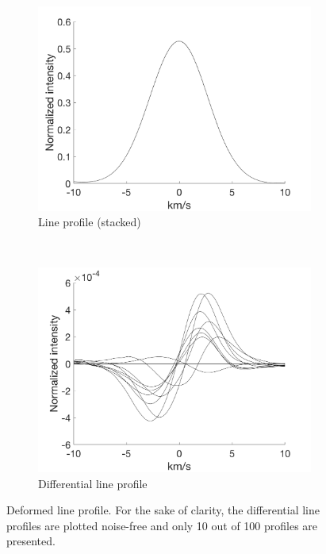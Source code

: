 \begin{figure}[tbp]
    \begin{subfigure}[b]{0.49\textwidth}
        \includegraphics[width=\textwidth]{./Figures/Methods/LPD1-Line_Profile.png}
        \caption{Line profile (stacked)}
    \end{subfigure}
	~
    \begin{subfigure}[b]{0.49\textwidth}
        \includegraphics[width=\textwidth]{./Figures/Methods/LPD1-Differential_line_Profile.png}
        \caption{Differential line profile}
        \label{fig:ld_dlp}
    \end{subfigure}	
    
    \caption[Deformed line profile]{Deformed line profile. For the sake of clarity, the differential line profiles are plotted noise-free and only 10 out of 100 profiles are presented.}
\label{fig:line_profiles_deformation}
\end{figure}	
\FloatBarrier

